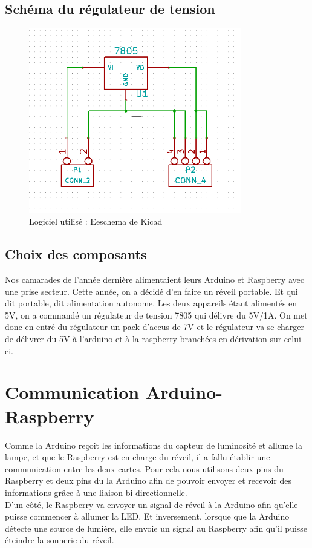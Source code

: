 \subsection{Schéma du régulateur de tension}
\begin{figure}[h]
	\centering
	\includegraphics[width=350px]{images/SchemaDuRegulateur.png}
	\caption{Logiciel utilisé : Eeschema de Kicad}
\end{figure}

\subsection{Choix des composants} 
	Nos camarades de l'année dernière alimentaient leurs Arduino et Raspberry avec une prise secteur. Cette année, on a décidé d'en faire un réveil portable. Et qui dit portable, dit alimentation autonome. Les deux appareils étant alimentés en 5V, on a commandé un régulateur de tension 7805 qui délivre du 5V/1A. On met donc en entré du régulateur un pack d'accus de 7V et le régulateur va se charger de délivrer du 5V à l'arduino et à la raspberry branchées en dérivation sur celui-ci.

\section{Communication Arduino-Raspberry}
	Comme la Arduino reçoit les informations du capteur de luminosité et allume la lampe, et que le Raspberry est en charge du réveil, il a fallu établir une communication entre les deux cartes. Pour cela nous utilisons deux pins du Raspberry et deux pins du la Arduino afin de pouvoir envoyer et recevoir des informations grâce à une liaison bi-directionnelle. \\
	D'un côté, le Raspberry va envoyer un signal de réveil à la Arduino afin qu'elle puisse commencer à allumer la LED. Et inversement, lorsque que la Arduino détecte une source de lumière, elle envoie un signal au Raspberry afin qu'il puisse éteindre la sonnerie du réveil.